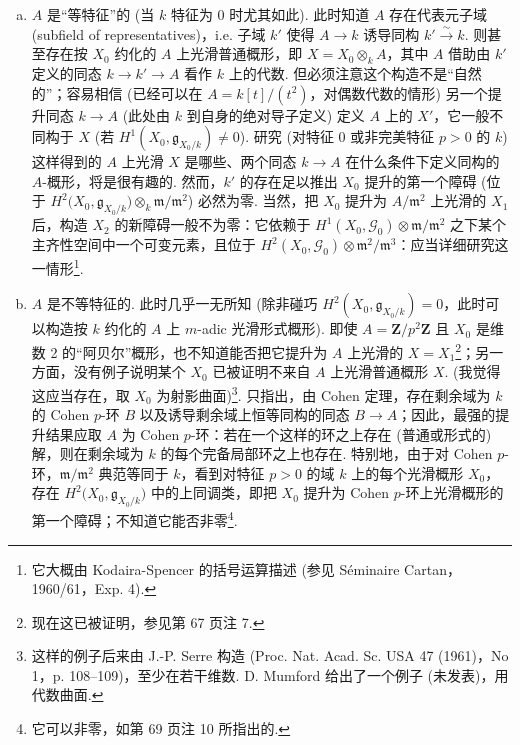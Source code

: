 \begin{enumerate}[a)]
\item $A$ 是``等特征''的 (当 $k$ 特征为 0 时尤其如此). 此时知道 $A$ 存在代表元子域 (subfield of representatives)，i.e. 子域 $k'$ 使得 $A \to k$ 诱导同构 $k' \xrightarrow{\sim} k$. 则甚至存在按 $X_0$ 约化的 $A$ 上光滑普通概形，即 $X = X_0 \otimes_k A$，其中 $A$ 借助由 $k'$ 定义的同态 $k \to k' \to A$ 看作 $k$ 上的代数. 但必须注意这个构造不是``自然的''；容易相信 (已经可以在 $A = k[t]/(t^2)$，对偶数代数的情形) 另一个提升同态 $k \to A$ (此处由 $k$ 到自身的绝对导子定义) 定义 $A$ 上的 $X'$，它一般不同构于 $X$ (若 $H^1(X_0, \mathfrak{g}_{X_0/k}) \neq 0$). 研究 (对特征 0 或非完美特征 $p > 0$ 的 $k$) 这样得到的 $A$ 上光滑 $X$ 是哪些、两个同态 $k \to A$ 在什么条件下定义同构的 $A$-概形，将是很有趣的. 然而，$k'$ 的存在足以推出 $X_0$ 提升的第一个障碍 (位于 $H^2\bigl(X_0, \mathfrak{g}_{X_0/k}\bigr) \otimes_k \mathfrak{m}/\mathfrak{m}^2$) 必然为零. 当然，把 $X_0$ 提升为 $A/\mathfrak{m}^2$ 上光滑的 $X_1$ 后，构造 $X_2$ 的新障碍一般不为零：它依赖于 $H^1(X_0, \mathcal{G}_0) \otimes \mathfrak{m}/\mathfrak{m}^2$ 之下某个主齐性空间中一个可变元素，且位于 $H^2(X_0, \mathcal{G}_0) \otimes \mathfrak{m}^2/\mathfrak{m}^3$：应当详细研究这一情形\footnote{它大概由 Kodaira-Spencer 的括号运算描述 (参见 Séminaire Cartan，1960/61，Exp. 4).}.
\item $A$ 是不等特征的. 此时几乎一无所知 (除非碰巧 $H^2(X_0, \mathfrak{g}_{X_0/k}) = 0$，此时可以构造按 $k$ 约化的 $A$ 上 $m$-adic 光滑形式概形). 即使 $A = \mathbf{Z}/p^2\mathbf{Z}$ 且 $X_0$ 是维数 2 的``阿贝尔''概形，也不知道能否把它提升为 $A$ 上光滑的 $X = X_1$\footnote{现在这已被证明，参见第 67 页注 7.}；另一方面，没有例子说明某个 $X_0$ 已被证明不来自 $A$ 上光滑普通概形 $X$. (我觉得这应当存在，取 $X_0$ 为射影曲面)\footnote{这样的例子后来由 J.-P. Serre 构造 (Proc. Nat. Acad. Sc. USA 47 (1961)，No 1，p. 108--109)，至少在若干维数. D. Mumford 给出了一个例子 (未发表)，用代数曲面.}. 只指出，由 Cohen 定理，存在剩余域为 $k$ 的 Cohen $p$-环 $B$ 以及诱导剩余域上恒等同构的同态 $B \to A$；因此，最强的提升结果应取 $A$ 为 Cohen $p$-环：若在一个这样的环之上存在 (普通或形式的) 解，则在剩余域为 $k$ 的每个完备局部环之上也存在. 特别地，由于对 Cohen $p$-环，$\mathfrak{m}/\mathfrak{m}^2$ 典范等同于 $k$，看到对特征 $p > 0$ 的域 $k$ 上的每个光滑概形 $X_0$，存在 $H^2\bigl(X_0, \mathfrak{g}_{X_0/k}\bigr)$ 中的上同调类，即把 $X_0$ 提升为 Cohen $p$-环上光滑概形的第一个障碍；不知道它能否非零\footnote{它可以非零，如第 69 页注 10 所指出的.}.
\end{enumerate}

